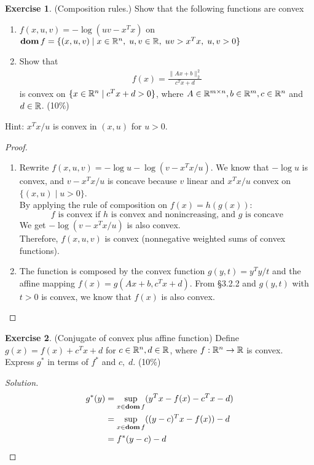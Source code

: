 \documentclass[12pt]{extarticle}
\theoremstyle{definition}
\newtheorem{exercise}{Exercise}
\begin{document}
\begin{exercise}
  (Composition rules.) Show that the following functions are convex
  \begin{enumerate}[label=(\alph*)]
    \item $f(x,u,v)=-\log(uv-x^Tx)$ on\\
          $\mathop{\bf dom} f=\{(x,u,v)\mid x\in\mathbb{R}^n,\;u,v\in\mathbb{R},\;uv>x^Tx,\;u,v>0\}$
    \item Show that
      \begin{align*}
        f(x)=\frac{\|Ax+b\|_2^2}{c^Tx+d}
      \end{align*}
      is convex on $\{x\in\mathbb{R}^n\mid c^Tx+d>0\}$, where $A\in\mathbb{R}^{m\times n}, b\in\mathbb{R}^m, c\in\mathbb{R}^n$ and $d\in\mathbb{R}$. (10\%)
  \end{enumerate}
  Hint: $x^Tx/u$ is convex in $(x,u)$ for $u>0$.
\end{exercise}
\begin{proof}
  $ $
  \begin{enumerate}[label=(\alph*)]
    \item Rewrite $f(x,u,v)=-\log u-\log(v-x^Tx/u)$.
          We know that $-\log u$ is convex, and $v-x^Tx/u$ is concave because $v$ linear and $x^Tx/u$ convex on $\{(x,u)\mid u>0\}$.\\
          By applying the rule of composition on $f(x)=h(g(x))$:
          $$f\text{ is convex if }h\text{ is convex and nonincreasing, and }g\text{ is concave}$$
          We get $-\log(v-x^Tx/u)$ is also convex.\\
          Therefore, $f(x,u,v)$ is convex (nonnegative weighted sums of convex functions).
    \item The function is composed by the convex function $g(y,t)=y^Ty/t$ and the affine mapping $f(x)=g(Ax+b,c^Tx+d)$.
          From \S 3.2.2 and $g(y,t)$ with $t>0$ is convex, we know that $f(x)$ is also convex.\qedhere
  \end{enumerate}
\end{proof}

\begin{exercise}
  (Conjugate of convex plus affine function) Define $g(x)=f(x)+c^Tx+d$ for $c\in\mathbb{R}^n,d\in\mathbb{R}$, where $f:\mathbb{R}^n\rightarrow\mathbb{R}$ is convex. Express $g^\ast$ in terms of $f^\ast$ and $c,\;d$. (10\%)
\end{exercise}
\begin{proof}[Solution]
  \let\qed\relax
  \begin{align*}
    g^\ast(y) &= \sup_{x\in\mathop{\bf dom} f} (y^Tx-f(x)-c^Tx-d)\\
              &= \sup_{x\in\mathop{\bf dom} f} ((y-c)^Tx-f(x))-d\\
              &= f^\ast(y-c)-d
  \end{align*}
\end{proof}
\end{document}
